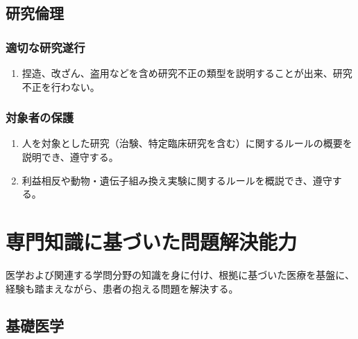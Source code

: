 \hypertarget{ux7814ux7a76ux502bux7406}{%
\subsection{研究倫理}\label{ux7814ux7a76ux502bux7406}}

\hypertarget{ux9069ux5207ux306aux7814ux7a76ux9042ux884c}{%
\subsubsection{適切な研究遂行}\label{ux9069ux5207ux306aux7814ux7a76ux9042ux884c}}

\begin{enumerate}
\def\labelenumi{\arabic{enumi}.}
\tightlist
\item
  捏造、改ざん、盗用などを含め研究不正の類型を説明することが出来、研究不正を行わない。
\end{enumerate}

\hypertarget{ux5bfeux8c61ux8005ux306eux4fddux8b77}{%
\subsubsection{対象者の保護}\label{ux5bfeux8c61ux8005ux306eux4fddux8b77}}

\begin{enumerate}
\def\labelenumi{\arabic{enumi}.}
\tightlist
\item
  人を対象とした研究（治験、特定臨床研究を含む）に関するルールの概要を説明でき、遵守する。
\item
  利益相反や動物・遺伝子組み換え実験に関するルールを概説でき、遵守する。
\end{enumerate}

\newpage

\hypertarget{ux5c02ux9580ux77e5ux8b58ux306bux57faux3065ux3044ux305fux554fux984cux89e3ux6c7aux80fdux529b}{%
\section{専門知識に基づいた問題解決能力}\label{ux5c02ux9580ux77e5ux8b58ux306bux57faux3065ux3044ux305fux554fux984cux89e3ux6c7aux80fdux529b}}

医学および関連する学問分野の知識を身に付け、根拠に基づいた医療を基盤に、経験も踏まえながら、患者の抱える問題を解決する。

\hypertarget{ux57faux790eux533bux5b66}{%
\subsection{基礎医学}\label{ux57faux790eux533bux5b66}}

